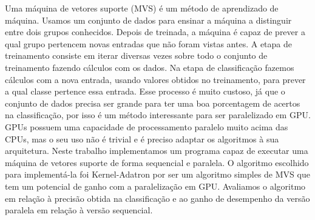 Uma máquina de vetores suporte (MVS) é um método de aprendizado de máquina.
Usamos um conjunto de dados para ensinar a máquina a distinguir entre dois grupos conhecidos. Depois de treinada, a máquina é capaz de prever a qual grupo pertencem novas entradas que não foram vistas antes.
A etapa de treinamento consiste em iterar diversas vezes sobre todo o conjunto de treinamento fazendo cálculos com os dados. 
Na etapa de classificação fazemos cálculos com a nova entrada, usando valores obtidos no treinamento, para prever a qual classe pertence essa entrada.
Esse processo é muito custoso, já que o conjunto de dados precisa ser grande para ter uma boa porcentagem de acertos na classificação, por isso é um método interessante para ser paralelizado em GPU. GPUs possuem uma capacidade de processamento paralelo muito acima das CPUs, mas o seu uso não é trivial e é preciso adaptar os algoritmos à sua arquitetura. 
Neste trabalho implementamos um programa capaz de executar uma máquina de vetores suporte de forma sequencial e paralela. O algoritmo escolhido para implementá-la foi Kernel-Adatron 
por ser um algoritmo simples de MVS que tem um potencial de ganho com a paralelização em GPU.
Avaliamos o algoritmo em relação à precisão obtida na classificação e ao ganho de desempenho da versão paralela em relação à versão sequencial.
